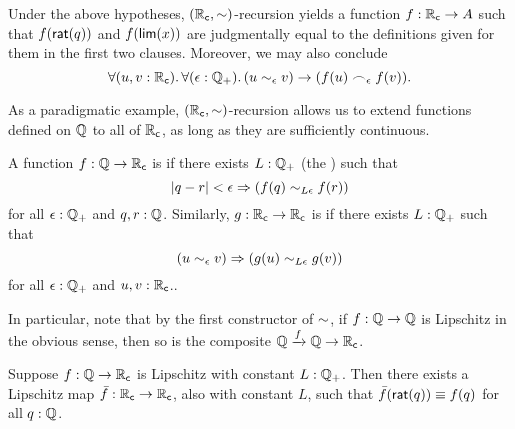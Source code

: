 Under the above hypotheses, $(\mathbb{R}_\mathsf{c},\mathord\sim)$-recursion yields a function $f:\mathbb{R}_\mathsf{c}\to A$ such that $f(\mathsf{rat}(q))$ and $f(\mathsf{lim}(x))$ are judgmentally equal to the definitions given for them in the first two clauses.
Moreover, we may also conclude
\begin{equation}
  \fall{u,v:\RC}{\epsilon:\Qp} (u\close\epsilon v) \to (f(u) \bsim_\epsilon f(v)).\label{eq:RC-sim-recursion-extra}
\end{equation}

As a paradigmatic example, $(\mathbb{R}_\mathsf{c},\mathord\sim)$-recursion allows us to extend functions defined on $\mathbb{Q}$ to all of $\mathbb{R}_\mathsf{c}$, as long as they are sufficiently continuous.

\begin{defn}\label{defn:lipschitz}
  A function $f:\mathbb{Q}\to\mathbb{R}_\mathsf{c}$ is 
  if there exists $L:\mathbb{Q}_{+}$ (the ) such that
  \[ |q - r|<\epsilon \Rightarrow (f(q) \sim_{L\epsilon} f(r)) \]
  for all $\epsilon:\mathbb{Q}_{+}$ and $q,r:\mathbb{Q}$.
  Similarly, $g:\mathbb{R}_\mathsf{c}\to\mathbb{R}_\mathsf{c}$ is  if there exists $L:\mathbb{Q}_{+}$ such that
  \[ (u\sim_{\epsilon} v) \Rightarrow (g(u) \sim_{L\epsilon} g(v)) \]
  for all $\epsilon:\mathbb{Q}_{+}$ and $u,v:\mathbb{R}_\mathsf{c}$..
\end{defn}

In particular, note that by the first constructor of $\mathord\sim$, if $f:\mathbb{Q}\to\mathbb{Q}$ is Lipschitz in the obvious sense, then so is the composite $\mathbb{Q}\xrightarrow{f} \mathbb{Q} \to \mathbb{R}_\mathsf{c}$.

\begin{lem}\label{RC-extend-Q-Lipschitz}
  Suppose $f : \mathbb{Q} \to \mathbb{R}_\mathsf{c}$ is Lipschitz with constant $L : \mathbb{Q}_{+}$.
  Then there exists a Lipschitz map $\bar{f} : \mathbb{R}_\mathsf{c} \to \mathbb{R}_\mathsf{c}$, also with constant $L$, such that $\bar{f}(\mathsf{rat}(q)) \equiv f(q)$ for all $q:\mathbb{Q}$.
\end{lem}

